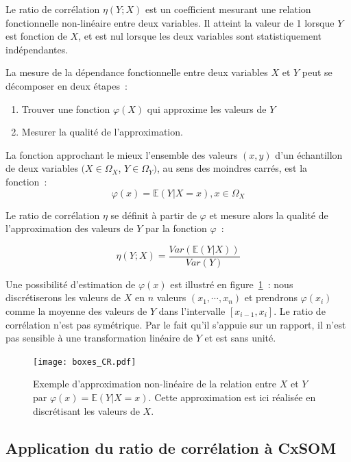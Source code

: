 \documentclass[../main]{subfiles}
\begin{document}
Le ratio de corrélation $\eta(Y;X)$ est un coefficient mesurant une relation fonctionnelle non-linéaire entre deux variables. Il atteint la valeur de 1 lorsque $Y$ est fonction de $X$, et est nul lorsque les deux variables sont statistiquement indépendantes.

La mesure de la dépendance fonctionnelle entre deux variables $X$ et $Y$ peut se décomposer en deux étapes~:
\begin{enumerate}
    \item Trouver une fonction $\varphi(X)$ qui approxime les valeurs de $Y$
    \item Mesurer la qualité de l'approximation.
\end{enumerate}

La fonction approchant le mieux l'ensemble des valeurs $(x,y)$ d'un échantillon de deux variables $(X \in \Omega_X$, $Y \in \Omega_Y)$, au sens des moindres carrés, est la fonction~:
\begin{equation}
    \varphi(x) = \mathbb{E}(Y|X = x), x \in \Omega_X
\end{equation}

Le ratio de corrélation $\eta$ se définit à partir de $\varphi$ et mesure alors la qualité de l'approximation des valeurs de $Y$ par la fonction $\varphi$~:

\begin{equation}\label{eq:cr}
   \eta(Y;X) = \frac{Var(\mathbb{E}(Y|X))}{Var(Y)}
\end{equation}

Une possibilité d'estimation de $\varphi(x)$ est illustré en figure~\ref{fig:cr_box}~: nous discrétiserons les valeurs de $X$ en $n$ valeurs $(x_1, \cdots, x_n)$ et prendrons $\varphi(x_i)$ comme la moyenne des valeurs de $Y$ dans l'intervalle $[x_{i-1}, x_i]$.
Le ratio de corrélation n'est pas symétrique. Par le fait qu'il s'appuie sur un rapport, il n'est pas sensible à une transformation linéaire de $Y$ et est sans unité.

\begin{figure}
    \centering
    \texttt{[image: boxes\_CR.pdf]}
    \caption{Exemple d'approximation non-linéaire de la relation entre $X$ et $Y$ par $\varphi(x)= \mathbb{E}(Y|X=x)$. Cette approximation est ici réalisée en discrétisant les valeurs de $X$. \label{fig:cr_box}}
\end{figure}

\subsection{Application du ratio de corrélation à CxSOM}
\end{document}
